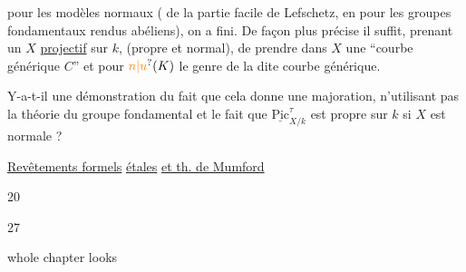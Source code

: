 
pour les modèles normaux ( de la partie facile de Lefschetz, en  pour les groupes fondamentaux rendus abéliens), on a fini. De façon plus précise il suffit, prenant un  $X$ \uline{projectif} sur $k$, (propre et normal), de prendre dans $X$ une ``courbe générique $C$'' et pour $\unsure{n|u}(K)$ le genre de la dite courbe générique.


Y-a-t-il une démonstration du fait que cela donne une majoration, n'utilisant pas la théorie du groupe fondamental et le fait que $\underline{\mathrm{Pic}}^{\tau}_{X/k}$ est propre sur $k$ si $X$ est normale ?


\uline{Revêtements formels} \uline{étales} \uline{et th. de Mumford}


20

27

whole chapter looks 


